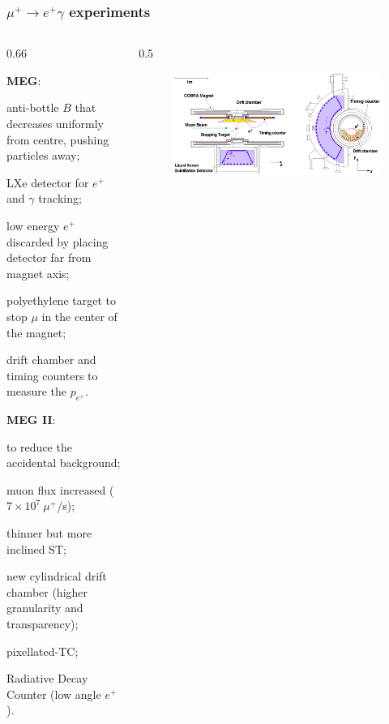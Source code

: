 \documentclass{beamer}
\begin{document}
    \begin{frame}
        \frametitle{$\mu^+ \rightarrow e^+ \gamma$ experiments}
        \vspace{-3mm}
\begin{columns}
 \begin{column}{0.66\framewidth}
 \setlength{\leftmargini}{1.1em}
    \begin{itemize}
   {\small     \item  \textbf{MEG}:}
         \begin{itemize}
             {\small 
            \item anti-bottle $B$ that decreases uniformly from centre, pushing particles away; 
            \item LXe detector for $e^+$ and $\gamma$ tracking;
            \item low energy $e^+$ discarded by placing detector far from magnet axis;
            \item polyethylene target to stop $\mu$ in the center of the magnet;
            \item drift chamber and timing counters to measure the $p_{e^+}$.   }
   \end{itemize}
   {\small      \item  \textbf{MEG II}:}
               \begin{itemize}
                {\small \item to reduce the accidental background;
                \item muon flux increased ({\footnotesize$7 \times 10^7 \ \mu^+$/s});
                \item thinner but more inclined ST;
                \item new cylindrical drift chamber (higher granularity and transparency);
                \item pixellated-TC;
                \item Radiative Decay Counter (low angle $e^+$).
                }
                \end{itemize}
    \end{itemize}
    \end{column}
    \begin{column}{0.5\framewidth}
        \begin{figure}[!h]
            \centering
            \includegraphics[width =\columnwidth]{figures/png/Screenshot_20240321_115127.png}

\end{figure}
\end{column}
\end{columns}
\end{frame}
\end{document}
